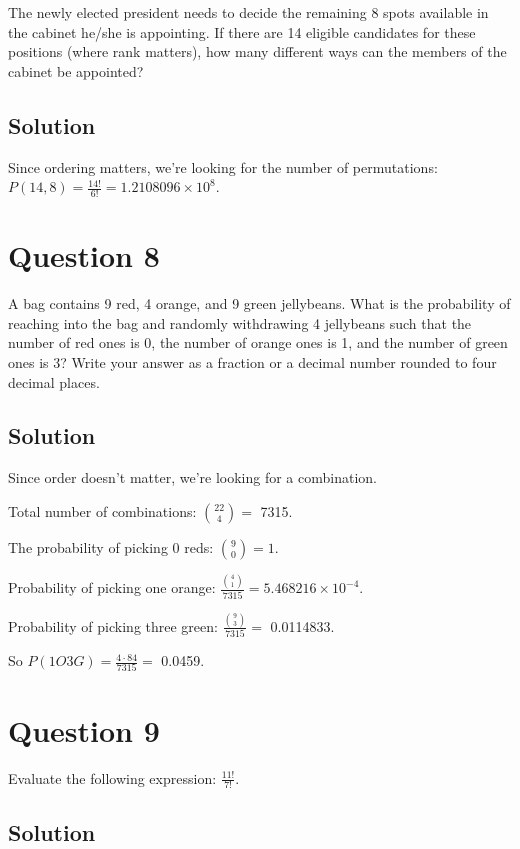 \documentclass[]{article}
\begin{document}
The newly elected president needs to decide the remaining 8 spots
available in the cabinet he/she is appointing. If there are 14 eligible
candidates for these positions (where rank matters), how many different
ways can the members of the cabinet be appointed?

\subsection{Solution}\label{solution-6}

Since ordering matters, we're looking for the number of permutations:
\(P(14,8) = \frac{14!}{6!} = 1.2108096\times 10^{8}\).

\section{Question 8}\label{question-8}

A bag contains 9 red, 4 orange, and 9 green jellybeans. What is the
probability of reaching into the bag and randomly withdrawing 4
jellybeans such that the number of red ones is 0, the number of orange
ones is 1, and the number of green ones is 3? Write your answer as a
fraction or a decimal number rounded to four decimal places.

\subsection{Solution}\label{solution-7}

Since order doesn't matter, we're looking for a combination.

Total number of combinations: \(\binom{22}{4} =\) 7315.

The probability of picking 0 reds: \(\binom{9}{0} = 1\).

Probability of picking one orange:
\(\frac{\binom{4}{1}}{7315} = 5.468216\times 10^{-4}\).

Probability of picking three green: \(\frac{\binom{9}{3}}{7315} =\)
0.0114833.

So \(P(1O3G) = \frac{4\cdot 84}{7315} =\) 0.0459.

\section{Question 9}\label{question-9}

Evaluate the following expression: \(\frac{11!}{7!}\).

\subsection{Solution}\label{solution-8}
\end{document}
